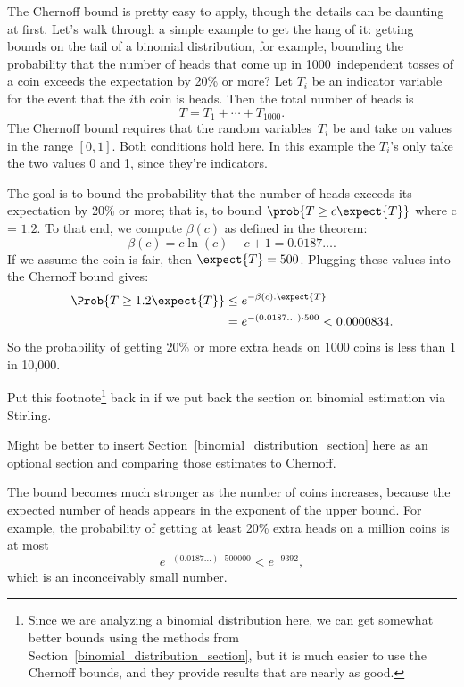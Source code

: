 The Chernoff bound is pretty easy to apply, though the details can be
daunting at first.  Let's walk through a simple example to get the
hang of it: getting bounds on the tail of a binomial distribution, for
example, bounding the probability that the number of heads that come up in
1000~independent tosses of a coin exceeds the expectation by 20\%
or more?  Let $T_i$ be an indicator variable for the event that the
$i$th coin is heads.  Then the total number of heads is
\begin{equation*}
    T = T_1 + \cdots + T_{1000}.
\end{equation*}
The Chernoff bound requires that the random variables~$T_i$ be
 and take on values in the range $[0, 1]$.
Both conditions hold here.  In this example the $T_i$'s only take the two
values 0 and 1, since they're indicators.

The goal is to bound the probability that the number of heads exceeds
its expectation by 20\% or more; that is, to bound $\prob{T \geq c
  \expect{T}}$ where c = $1.2$.  To that end, we compute $\beta(c)$ as
defined in the theorem:
\[
\beta(c) = c \ln(c) - c + 1 = 0.0187\dots.
\]
If we assume the coin is fair, then $\expect{T} = 500$.
Plugging these values into the Chernoff bound gives:
\begin{align*}
\Prob{T \geq 1.2 \expect{T}} & \leq  e^{- \beta(c). \expect{T}} \\
  & = e^{- (0.0187\dots) \cdot 500} <  0.0000834.
\end{align*}
So the probability of getting 20\% or more extra heads on 1000 coins
is less than 1 in 10,000.

\begin{editingnotes}
Put this footnote\footnote{Since we are analyzing a binomial
  distribution here, we can get somewhat better bounds using the
  methods from Section~\ref{binomial_distribution_section}, but it is
  much easier to use the Chernoff bounds, and they provide results
  that are nearly as good.} back in if we put back the section on binomial estimation
via Stirling.

Might be better to insert Section~\ref{binomial_distribution_section}
here as an optional section and comparing those estimates to
Chernoff.
\end{editingnotes}

The bound becomes much stronger as the number of coins increases,
because the expected number of heads appears in the exponent of the
upper bound.  For example, the probability of getting at least 20\%
extra heads on a million coins is at most
\[
e^{- (0.0187\dots) \cdot 500000} < e^{-9392},
\]
which is an inconceivably small number.  %

